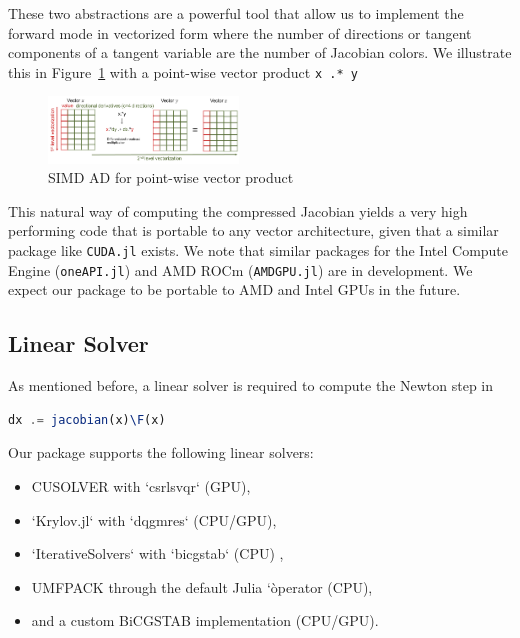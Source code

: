 \documentclass{juliacon}
\newcommand{\reffig}[1]{Figure~\ref{#1}}
\begin{document}
These two abstractions are a powerful tool that allow us to implement the
forward mode in vectorized form where the number of directions or tangent
components of a tangent variable are the number of Jacobian colors. We
illustrate this in \reffig{fig:simd} with a point-wise vector product \lstinline{x .* y}

\begin{figure}
    \centering
    \includegraphics[width=0.45\textwidth]{figures/simd.png}
    \caption{SIMD AD for point-wise vector product}
    \label{fig:simd}
\end{figure}

This natural way of computing the compressed Jacobian yields a very high
performing code that is portable to any vector architecture, given that a
similar package like \lstinline{CUDA.jl} exists. We note that similar packages for the
Intel Compute Engine (\lstinline{oneAPI.jl}) and AMD ROCm (\lstinline{AMDGPU.jl}) are in development.
We expect our package to be portable to AMD and Intel GPUs in the future.

\subsection{Linear Solver}

As mentioned before, a linear solver is required to compute the Newton step in

\begin{lstlisting}[language = Julia]
dx .= jacobian(x)\F(x)
\end{lstlisting}

Our package supports the following linear solvers:

\begin{itemize}
    \item CUSOLVER with `csrlsvqr` (GPU),
    \item `Krylov.jl` with `dqgmres` (CPU/GPU),
    \item `IterativeSolvers` with `bicgstab` (CPU) \cite{sleijpen1993bicgstab},
    \item UMFPACK through the default Julia `\` operator (CPU),
    \item and a custom BiCGSTAB implementation \cite{bicgstabVorst} (CPU/GPU).
\end{itemize}
\end{document}
